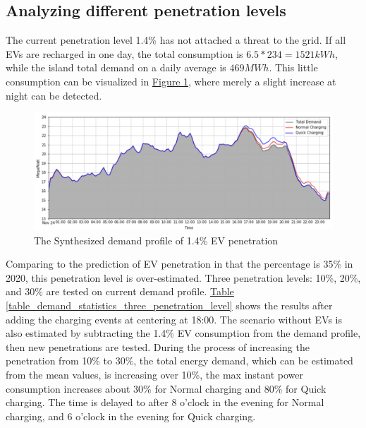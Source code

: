 \documentclass[12pt,a4paper]{report}
\begin{document}
                \subsection{Analyzing different penetration levels}
                The current penetration level 1.4\% has not attached a threat to the grid. If all EVs are recharged in one day, the total consumption is $6.5 * 234 = 1521 kW h$, while the island total demand on a daily average is $469 MW h$. This little consumption can be visualized in \hyperref[fig_1.4_syn]{Figure \ref*{fig_1.4_syn}}, where merely a slight increase at night can be detected.

                \begin{figure}[ht]
                    \centerline{\includegraphics[scale=1]{currentsyn}}
                    \caption{The Synthesized demand profile of 1.4\% EV penetration}
                    \label{fig_1.4_syn}
                \end{figure}

                Comparing to the prediction of EV penetration in \cite{paper:Vazquez2010} that the percentage is 35\% in 2020, this penetration level is over-estimated.
                Three penetration levels: 10\%, 20\%, and 30\% are tested on current demand profile. \hyperref[table_demand_statistics_three_penetration_level]{Table \ref*{table_demand_statistics_three_penetration_level}} shows the results after adding the charging events at centering at 18:00.
                The scenario without EVs is also estimated by subtracting the 1.4\% EV consumption from the demand profile, then new penetrations are tested. During the process of increasing the penetration from 10\% to 30\%, the total energy demand, which can be estimated from the mean values, is increasing over 10\%, the max instant power consumption increases about 30\% for Normal charging and 80\% for Quick charging. The time is delayed to after 8 o'clock in the evening for Normal charging, and 6 o'clock in the evening for Quick charging.
\end{document}
